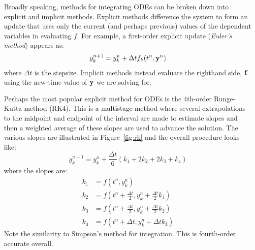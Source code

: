 Broadly speaking, methods for integrating ODEs can be broken down into
explicit and implicit methods.  Explicit methods difference the system
to form an update that uses only the current (and perhaps previous)
values of the dependent variables in evaluating $f$.  For example, a
first-order explicit update ({\em Euler's method}) appears as:
\begin{equation}
y^{n+1}_k = y^n_k + \Delta t f_k(t^n, {\bf y}^n)
\end{equation}
where $\Delta t$ is the stepsize.  Implicit methods instead evaluate
the righthand side, ${\bf f}$ using the new-time value of ${\bf y}$
we are solving for.

Perhaps the most popular explicit method for ODEs is the 4th-order
Runge-Kutta method (RK4).  This is a multistage method where several
extrapolations to the midpoint and endpoint of the interval are
made to estimate slopes and then a weighted average of these slopes
are used to advance the solution.  The various slopes
are illustrated in Figure~\ref{fig:rk} and the overall procedure looks like:
\begin{equation}
y_k^{n+1} = y_k^n + \frac{\Delta t}{6} (k_1 + 2 k_2 + 2 k_3 + k_4)
\end{equation}
where the slopes are:
\begin{align}
k_1 &= f(t^n, y_k^n) \\
k_2 &= f(t^n + \tfrac{\Delta t}{2}, y_k^n + \tfrac{\Delta t}{2} k_1) \\
k_3 &= f(t^n + \tfrac{\Delta t}{2}, y_k^n + \tfrac{\Delta t}{2} k_2) \\
k_4 &= f(t^n + \Delta t, y_k^n + \Delta t k_3)
\end{align}
Note the similarity to Simpson's method for integration.  This is
fourth-order accurate overall.



